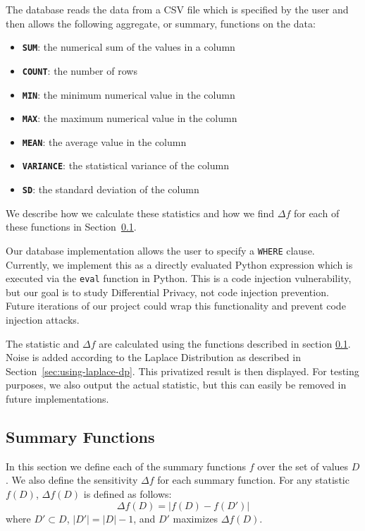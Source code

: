 \documentclass[conference,11pt]{IEEEtran}
\begin{document}
The database reads the data from a CSV file which is specified by the user and
then allows the following aggregate, or summary, functions on the data:
\begin{itemize}
    \item \textbf{\texttt{SUM}}: the numerical sum of the values in a column
    \item \textbf{\texttt{COUNT}}: the number of rows
    \item \textbf{\texttt{MIN}}: the minimum numerical value in the column
    \item \textbf{\texttt{MAX}}: the maximum numerical value in the column
    \item \textbf{\texttt{MEAN}}: the average value in the column
    \item \textbf{\texttt{VARIANCE}}: the statistical variance of the column
    \item \textbf{\texttt{SD}}: the standard deviation of the column
\end{itemize}

We describe how we calculate these statistics and how we find $\Delta f$ for
each of these functions in Section~\ref{sec:summary-functions}.

Our database implementation allows the user to specify a \texttt{WHERE} clause.
Currently, we implement this as a directly evaluated Python expression which is
executed via the \texttt{eval} function in Python. This is a code injection
vulnerability, but our goal is to study Differential Privacy, not code injection
prevention. Future iterations of our project could wrap this functionality and
prevent code injection attacks.


The statistic and $\Delta f$ are calculated using the functions described in
section \ref{sec:summary-functions}. Noise is added according to the Laplace
Distribution as described in Section~\ref{sec:using-laplace-dp}. This privatized
result is then displayed. For testing purposes, we also output the actual
statistic, but this can easily be removed in future implementations.

\subsection{Summary Functions}\label{sec:summary-functions}
In this section we define each of the summary functions $f$ over the set of
values $D$. We also define the sensitivity $\Delta f$ for each summary function.
For any statistic $f(D)$, $\Delta f(D)$ is defined as follows:
\begin{equation}
    \Delta f(D) = \left|f(D) - f(D')\right|
\end{equation}
where $D' \subset D$, $|D'| = |D| - 1$, and $D'$ maximizes $\Delta f(D)$.
\end{document}
